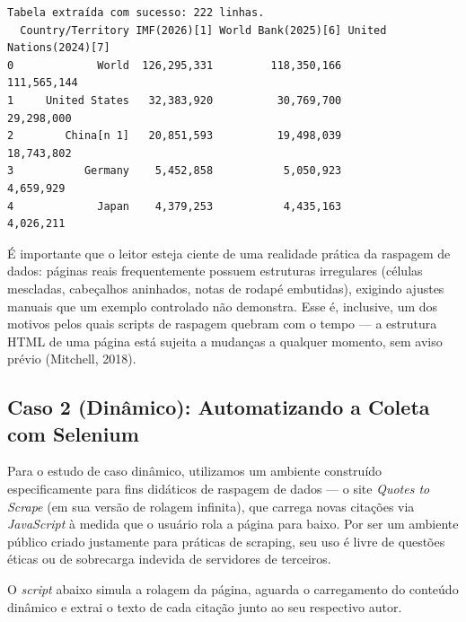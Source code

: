 \documentclass[
  brazilian,
  letterpaper,
  DIV=11,
  numbers=noendperiod]{scrreprt}
\begin{document}
\begin{verbatim}
Tabela extraída com sucesso: 222 linhas.
  Country/Territory IMF(2026)[1] World Bank(2025)[6] United Nations(2024)[7]
0             World  126,295,331         118,350,166             111,565,144
1     United States   32,383,920          30,769,700              29,298,000
2        China[n 1]   20,851,593          19,498,039              18,743,802
3           Germany    5,452,858           5,050,923               4,659,929
4             Japan    4,379,253           4,435,163               4,026,211
\end{verbatim}

É importante que o leitor esteja ciente de uma realidade prática da
raspagem de dados: páginas reais frequentemente possuem estruturas
irregulares (células mescladas, cabeçalhos aninhados, notas de rodapé
embutidas), exigindo ajustes manuais que um exemplo controlado não
demonstra. Esse é, inclusive, um dos motivos pelos quais scripts de
raspagem quebram com o tempo --- a estrutura HTML de uma página está
sujeita a mudanças a qualquer momento, sem aviso prévio (Mitchell,
2018).

\subsection{Caso 2 (Dinâmico): Automatizando a Coleta com
Selenium}\label{caso-2-dinuxe2mico-automatizando-a-coleta-com-selenium}

Para o estudo de caso dinâmico, utilizamos um ambiente construído
especificamente para fins didáticos de raspagem de dados --- o site
\emph{Quotes to Scrape} (em sua versão de rolagem infinita), que carrega
novas citações via \emph{JavaScript} à medida que o usuário rola a
página para baixo. Por ser um ambiente público criado justamente para
práticas de scraping, seu uso é livre de questões éticas ou de
sobrecarga indevida de servidores de terceiros.

O \emph{script} abaixo simula a rolagem da página, aguarda o
carregamento do conteúdo dinâmico e extrai o texto de cada citação junto
ao seu respectivo autor.
\end{document}
